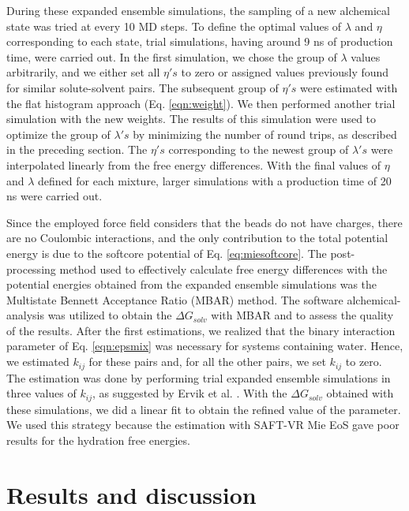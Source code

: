 \documentclass[final,12p,times,twocolumn]{elsarticle}
\begin{document}
	During these expanded ensemble simulations, the sampling of a new alchemical state was tried at every 10 MD steps. To define the optimal values of $\lambda$ and $\eta$ corresponding to each state, trial simulations, having around 9 ns of production time, were carried out. In the first simulation, we chose the group of $\lambda$ values arbitrarily, and we either set all $\eta 's$ to zero or assigned values previously found for similar solute-solvent pairs. The subsequent group of $\eta 's$ were estimated with the flat histogram approach (Eq. \ref{eqn:weight}). We then performed another trial simulation with the new weights. The results of this simulation were used to optimize the group of $\lambda 's$ by minimizing the number of round trips, as described in the preceding section. The $\eta 's$ corresponding to the newest group of $\lambda 's$ were interpolated linearly from the free energy differences. With the final values of $\eta$ and $\lambda $ defined for each mixture, larger simulations with a production time of 20 ns were carried out.  
	
	Since the employed force field considers that the beads do not have charges, there are no Coulombic interactions, and the only contribution to the total potential energy is due to the softcore potential of Eq. \ref{eq:miesoftcore}. The post-processing method used to effectively calculate free energy differences with the potential energies obtained from the expanded ensemble simulations was the Multistate Bennett Acceptance Ratio (MBAR) method. The software alchemical-analysis \cite{klimovich} was utilized to obtain the $\Delta G_{solv}$ with MBAR and to assess the quality of the results. After the first estimations, we realized that the binary interaction parameter of Eq. \ref{eqn:epsmix} was necessary for systems containing water. Hence, we estimated  $k_{ij}$ for these pairs and, for all the other pairs, we set  $k_{ij}$ to zero. The estimation was done by performing trial expanded ensemble simulations in three values of $k_{ij}$, as suggested by Ervik et al. \cite{ervik20162}. With the $\Delta G_{solv}$ obtained with these simulations, we did a linear fit to obtain the refined value of the parameter. We used this strategy because the estimation with SAFT-VR Mie EoS gave poor results for the hydration free energies.
	
	\section{Results and discussion}
	
\end{document}

